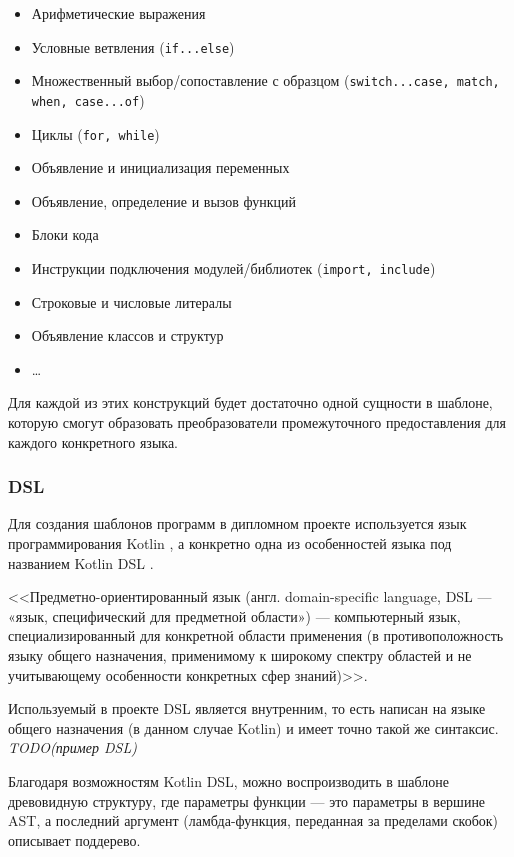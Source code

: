 \begin{itemize}
    \item Арифметические выражения
    \item Условные ветвления (\texttt{if...else})
    \item Множественный выбор/сопоставление с образцом (\texttt{switch...case, match, when, case...of})
    \item Циклы (\texttt{for, while})
    \item Объявление и инициализация переменных
    \item Объявление, определение и вызов функций
    \item Блоки кода
    \item Инструкции подключения модулей/библиотек (\texttt{import, include})
    \item Строковые и числовые литералы
    \item Объявление классов и структур
    \item \dots
\end{itemize}
\label{syntax-items}

Для каждой из этих конструкций будет достаточно одной сущности в шаблоне, которую смогут образовать
преобразователи промежуточного предоставления для каждого конкретного языка.
\subsubsection{DSL}

Для создания шаблонов программ в дипломном проекте используется язык программирования Kotlin \cite{kotlin}, а
конкретно одна из особенностей языка под названием Kotlin DSL \cite{kotlin-dsl}.

<<Предметно-ориентированный язык (англ. domain-specific language, DSL — «язык, специфический для предметной области») — компьютерный язык, специализированный для конкретной области применения (в противоположность языку общего назначения, применимому к широкому спектру областей и не учитывающему особенности конкретных сфер знаний)>>.
\cite{dsl}

Используемый в проекте DSL является внутренним, то есть написан на языке общего назначения
(в данном случае Kotlin) и имеет точно такой же синтаксис.
\textit{TODO(пример DSL)}

Благодаря возможностям Kotlin DSL, можно воспроизводить в шаблоне древовидную структуру, где параметры
функции --- это параметры в вершине AST, а последний аргумент (ламбда-функция, переданная за пределами скобок)
описывает поддерево.

